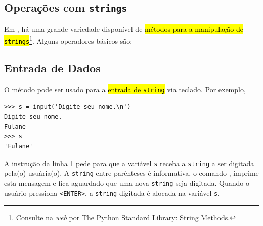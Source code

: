 \subsection{Operações com \texttt{strings}}

Em {\python}, há uma grande variedade disponível de \hl{métodos para a manipulação de \texttt{strings}}\footnote{Consulte na \textit{web} por \href{https://docs.python.org/3/library/stdtypes.html\#string-methods}{The Python Standard Library: String Methods}.}. Alguns operadores básicos são:

\subsection{Entrada de Dados}

O método {\PYTHONinput} pode ser usado para a \hl{entrada de \texttt{string}} via teclado. Por exemplo,

\begin{lstlisting}
>>> s = input('Digite seu nome.\n')
Digite seu nome.
Fulane
>>> s
'Fulane'
\end{lstlisting}

A instrução da linha 1 pede para que a variável \lstinline+s+ receba a \texttt{string} a ser digitada pela(o) usuária(o). A \texttt{string} entre parênteses é informativa, o comando {\PYTHONinput}, imprime esta mensagem e fica aguardado que uma nova \texttt{string} seja digitada. Quando o usuário pressiona \lstinline+<ENTER>+, a \texttt{string} digitada é alocada na variável \lstinline+s+.

